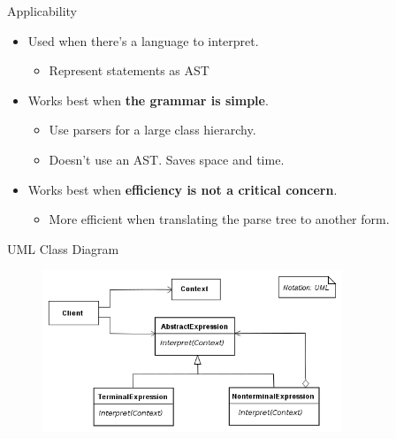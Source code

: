    \begin{frame}{Applicability}
        \begin{itemize}
            \item Used when there's a language to interpret.
            \begin{itemize}
                \item Represent statements as AST
            \end{itemize}

            \item Works best when \textbf{the grammar is simple}.
            \begin{itemize}
                \item Use parsers for a large class hierarchy.
                \item Doesn't use an AST. Saves space and time.
            \end{itemize}

            \item Works best when \textbf{efficiency is not a critical concern}.
            \begin{itemize}
                \item More efficient when translating the parse tree to another form.
            \end{itemize}
        \end{itemize}

    \end{frame}

    \begin{frame}{UML Class Diagram}
        \begin{figure}
            \centering
                \includegraphics[width=0.8\textwidth]{figures/uml_class_diagram.png}
          \end{figure}
    \end{frame}
    
